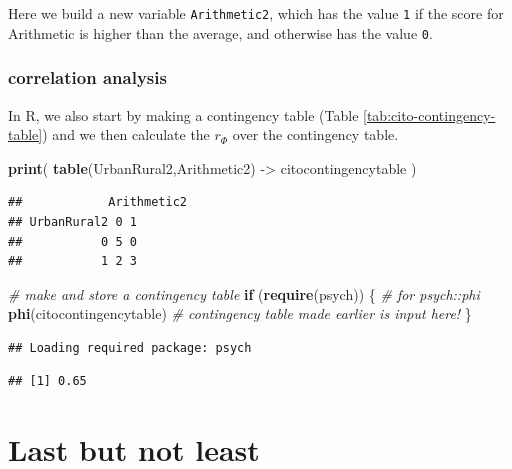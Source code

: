 \documentclass[
]{book}
\newenvironment{Shaded}{\begin{snugshade}}{\end{snugshade}}
\newcommand{\CommentTok}[1]{\textcolor[rgb]{0.56,0.35,0.01}{\textit{#1}}}
\newcommand{\ControlFlowTok}[1]{\textcolor[rgb]{0.13,0.29,0.53}{\textbf{#1}}}
\newcommand{\FunctionTok}[1]{\textcolor[rgb]{0.13,0.29,0.53}{\textbf{#1}}}
\newcommand{\NormalTok}[1]{#1}
\newcommand{\OtherTok}[1]{\textcolor[rgb]{0.56,0.35,0.01}{#1}}
\begin{document}
Here we build a new variable \texttt{Arithmetic2}, which has the value \texttt{1} if the score for
Arithmetic is higher than the average, and otherwise has the value \texttt{0}.

\hypertarget{correlation-analysis-2}{%
\subsubsection{correlation analysis}\label{correlation-analysis-2}}

In R, we also start by making a contingency table (Table \ref{tab:cito-contingency-table}) and we then calculate the \(r_\Phi\) over the contingency table.

\begin{Shaded}
\begin{Highlighting}[]
\FunctionTok{print}\NormalTok{( }\FunctionTok{table}\NormalTok{(UrbanRural2,Arithmetic2) }\OtherTok{{-}\textgreater{}}\NormalTok{ citocontingencytable ) }
\end{Highlighting}
\end{Shaded}

\begin{verbatim}
##            Arithmetic2
## UrbanRural2 0 1
##           0 5 0
##           1 2 3
\end{verbatim}

\begin{Shaded}
\begin{Highlighting}[]
\CommentTok{\# make and store a contingency table}
\ControlFlowTok{if}\NormalTok{ (}\FunctionTok{require}\NormalTok{(psych)) \{ }\CommentTok{\# for psych::phi}
  \FunctionTok{phi}\NormalTok{(citocontingencytable) }\CommentTok{\# contingency table made earlier is input here!}
\NormalTok{\}}
\end{Highlighting}
\end{Shaded}

\begin{verbatim}
## Loading required package: psych
\end{verbatim}

\begin{verbatim}
## [1] 0.65
\end{verbatim}

\hypertarget{sec:correlationcausation}{%
\section{Last but not least}\label{sec:correlationcausation}}
\end{document}

